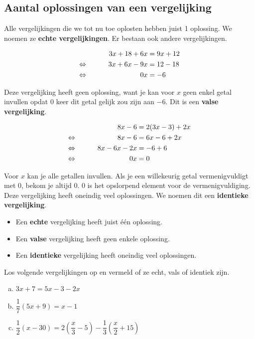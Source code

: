 \documentclass[12pt]{article}
\begin{document}
\subsection{Aantal oplossingen van een vergelijking}

Alle vergelijkingen die we tot nu toe oplosten hebben juist 1 oplossing. We noemen ze {\bf echte vergelijkingen}. Er bestaan ook andere vergelijkingen.

\begin{voorbeeld}
\begin{alignat*}{2}
     && 3x + 18 + 6x &= 9x + 12\\
\Leftrightarrow\mkern40mu && 3x + 6x - 9x &= 12 - 18\\
\Leftrightarrow\mkern40mu && 0x	&= - 6
\end{alignat*}
\end{voorbeeld}

Deze vergelijking heeft geen oplossing, want je kan voor $x$ geen enkel getal invullen opdat $0$ keer dit getal gelijk zou zijn aan $-6$. Dit is een {\bf valse vergelijking}.

\begin{voorbeeld}
\begin{alignat*}{2}
     && 8x - 6	&= 2(3x - 3) + 2x\\
\Leftrightarrow\mkern40mu && 8x - 6	&= 6x - 6 + 2x\\
\Leftrightarrow\mkern40mu && 8x - 6x - 2x	&= - 6 + 6\\
\Leftrightarrow\mkern40mu && 0x	&= 0
\end{alignat*}
\end{voorbeeld}

Voor $x$ kan je alle getallen invullen. Als je een willekeurig getal vermenigvuldigt met 0, bekom je altijd 0. 0 is het opslorpend element voor de vermenigvuldiging. Deze vergelijking heeft oneindig veel oplossingen. We noemen dit een {\bf identieke vergelijking}.

\begin{onthoud}
\begin{itemize}
  \item Een {\bf echte} vergelijking heeft juist één oplossing.
  \item Een {\bf valse} vergelijking heeft geen enkele oplossing.
  \item Een {\bf identieke} vergelijking heeft oneindig veel oplossingen.
\end{itemize}
\end{onthoud}

\begin{exercise}
Los volgende vergelijkingen op en vermeld of ze echt, vals of identiek zijn.
\begin{enumerate}[(a)]
  \item $3x + 7 = 5x - 3 - 2x$
  \item $\dfrac{1}{7}(5x+9) = x - 1$
  \item $\dfrac{1}{2}(x-30)=2(\dfrac{x}{3}-5)-\dfrac{1}{3}(\dfrac{x}{2}+15)$
\end{enumerate}
\end{exercise}
\end{document}
